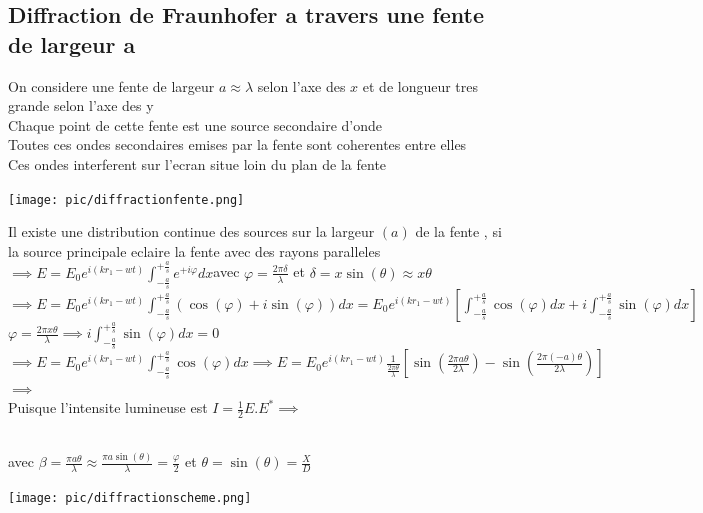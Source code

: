 \documentclass[12pt]{book}
\begin{document}
            \subsection{Diffraction de Fraunhofer a travers une fente de largeur a}
                On considere une fente de largeur $a \approx \lambda$ selon l'axe des $x$ et de longueur tres grande selon l'axe des y \\
                Chaque point de cette fente est une source secondaire d'onde \\
                Toutes ces ondes secondaires emises par la fente sont coherentes entre elles \\
                Ces ondes interferent sur l'ecran situe loin du plan de la fente
                \begin{center}
                    \texttt{[image: pic/diffractionfente.png]}
                \end{center}
                Il existe une distribution continue des sources sur la largeur $(a)$ de la fente , si la source principale eclaire la fente avec des rayons paralleles \\
                $\implies E = E_0e^{i(kr_1-wt)}\int^{+\frac{a}{s}}_{-\frac{a}{s}}e^{+i\varphi}dx $avec $\varphi = \frac{2\pi\delta}{\lambda}$ et $\delta = x\sin(\theta)\approx x\theta$  \\
                $\implies  E = E_0e^{i(kr_1-wt)}\int^{+\frac{a}{s}}_{-\frac{a}{s}}(\cos(\varphi)+i\sin(\varphi))dx = E_0e^{i(kr_1-wt)}\left[ \int^{+\frac{a}{s}}_{-\frac{a}{s}}\cos(\varphi)dx + i\int^{+\frac{a}{s}}_{-\frac{a}{s}}\sin(\varphi)dx \right]$\\
                $\varphi = \frac{2\pi x\theta}{\lambda}\implies i\int^{+\frac{a}{s}}_{-\frac{a}{s}}\sin(\varphi)dx =0$ \\
                $\implies E = E_0e^{i(kr_1-wt)}\int^{+\frac{a}{s}}_{-\frac{a}{s}}\cos(\varphi)dx \implies E =  E_0e^{i(kr_1-wt)} \frac{1}{\frac{2\pi\theta}{\lambda}}\left[ \sin(\frac{2\pi a \theta}{2\lambda}) -\sin(\frac{2\pi(-a)\theta}{2\lambda}) \right] $\\
                $\implies$ \\
                Puisque l'intensite lumineuse est $I = \frac{1}{2}E.E^{*} \implies $
                \begin{center}  
                    \begin{minipage}{0.6\linewidth}
                        \\
                        avec $\beta = \frac{\pi a \theta}{\lambda} \approx \frac{\pi a \sin(\theta)}{\lambda}=\frac{\varphi}{2}$ et $\theta = \sin(\theta)=\frac{X}{D}$
                    \end{minipage}
                    \begin{minipage}{0.39\linewidth}
                        \texttt{[image: pic/diffractionscheme.png]}
                    \end{minipage}
                \end{center}
\end{document}
